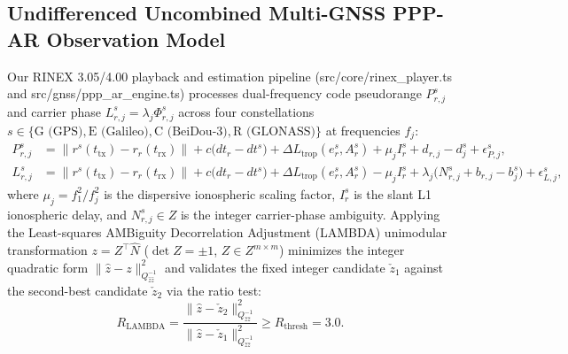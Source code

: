 \documentclass[11pt,a4paper,reqno]{article}
\def\bm#1{#1}%
\def\mathbb#1{#1}%
\def\path#1{#1}%
\theoremstyle{plain}
\theoremstyle{definition}
\theoremstyle{remark}
\numberwithin{equation}{section}
\begin{document}
\subsection{Undifferenced Uncombined Multi-GNSS PPP-AR Observation Model}
Our RINEX 3.05/4.00 playback and estimation pipeline (\path{src/core/rinex_player.ts} and \path{src/gnss/ppp_ar_engine.ts}) processes dual-frequency code pseudorange $P_{r,j}^s$ and carrier phase $L_{r,j}^s = \lambda_j \Phi_{r,j}^s$ across four constellations $s \in \{\text{G (GPS)}, \text{E (Galileo)}, \text{C (BeiDou-3)}, \text{R (GLONASS)}\}$ at frequencies $f_j$:
\begin{align}
  P_{r,j}^s &= \|\bm{r}^s(t_{\text{tx}}) - \bm{r}_r(t_{\text{rx}})\| + c\big(dt_r - dt^s\big) + \Delta L_{\text{trop}}(e_r^s, A_r^s) + \mu_j I_r^s + d_{r,j} - d_j^s + \epsilon_{P,j}^s, \label{eq:uduc_code} \\
  L_{r,j}^s &= \|\bm{r}^s(t_{\text{tx}}) - \bm{r}_r(t_{\text{rx}})\| + c\big(dt_r - dt^s\big) + \Delta L_{\text{trop}}(e_r^s, A_r^s) - \mu_j I_r^s + \lambda_j\big(N_{r,j}^s + b_{r,j} - b_j^s\big) + \epsilon_{L,j}^s, \label{eq:uduc_phase}
\end{align}
where $\mu_j = f_1^2 / f_j^2$ is the dispersive ionospheric scaling factor, $I_r^s$ is the slant L1 ionospheric delay, and $N_{r,j}^s \in \mathbb{Z}$ is the integer carrier-phase ambiguity. Applying the Least-squares AMBiguity Decorrelation Adjustment (LAMBDA) unimodular transformation $\bm{z} = \bm{Z}^\top \hat{\bm{N}}$ ($\det\bm{Z} = \pm 1$, $\bm{Z} \in \mathbb{Z}^{m \times m}$) minimizes the integer quadratic form $\|\hat{\bm{z}} - \bm{z}\|_{\bm{Q}_{\hat{z}\hat{z}}^{-1}}^2$ and validates the fixed integer candidate $\check{\bm{z}}_1$ against the second-best candidate $\check{\bm{z}}_2$ via the ratio test:
\begin{equation}
  R_{\text{LAMBDA}} = \frac{\|\hat{\bm{z}} - \check{\bm{z}}_2\|_{\bm{Q}_{\hat{z}\hat{z}}^{-1}}^2}{\|\hat{\bm{z}} - \check{\bm{z}}_1\|_{\bm{Q}_{\hat{z}\hat{z}}^{-1}}^2} \ge R_{\text{thresh}} = 3.0.
  \label{eq:lambda_ratio}
\end{equation}
\end{document}
